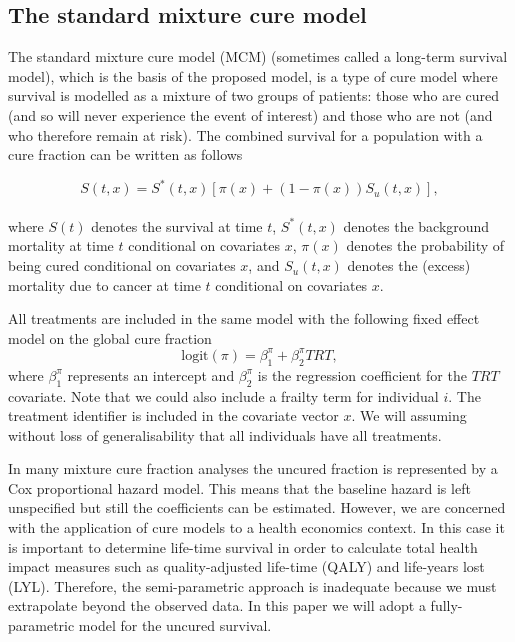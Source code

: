 \documentclass[AMA,STIX1COL]{WileyNJD-v2}
\begin{document}
\subsection{The standard mixture cure model} \label{section:basic_model}
The standard mixture cure model (MCM) (sometimes called a long-term survival model), which is the basis of the proposed model,
is a type of cure model where survival is modelled as a mixture of two groups of patients:
those who are cured (and so will never experience the event of interest) and those who are not (and who therefore remain at risk).
The combined survival for a population with a cure fraction can be written as follows

\begin{equation}
\label{eqn:mcm}
S(t, x) = S^*(t, x) [\pi(x) + (1 - \pi(x)) S_u(t, x)],
\end{equation}
\\
\noindent
where $S(t)$ denotes the survival at time $t$, $S^*(t, x)$ denotes the background mortality
at time $t$ conditional on covariates $x$,
$\pi(x)$ denotes the probability of being cured conditional on covariates $x$,
and $S_{u}(t, x)$ denotes the (excess) mortality due to cancer at time $t$ conditional on covariates $x$.

All treatments are included in the same model with the following fixed effect model on the global cure fraction
$$
\text{logit}(\pi) = \beta^{\pi}_1 + \beta^{\pi}_2 TRT,
$$
where $\beta^{\pi}_1$ represents an intercept and $\beta^{\pi}_2$ is the regression coefficient for the $TRT$ covariate.
Note that we could also include a frailty term for individual $i$.
The treatment identifier is included in the covariate vector $x$.
We will assuming without loss of generalisability that all individuals have all treatments.

In many mixture cure fraction analyses the uncured fraction is represented by a Cox proportional hazard model.
This means that the baseline hazard is left unspecified but still the coefficients can be estimated.
However, we are concerned with the application of cure models to a health economics context.
In this case it is important to determine life-time survival in order to calculate total health impact measures such as quality-adjusted life-time (QALY) and life-years lost (LYL).
Therefore, the semi-parametric approach is inadequate because we must extrapolate beyond the observed data.
In this paper we will adopt a fully-parametric model for the uncured survival.
\end{document}
